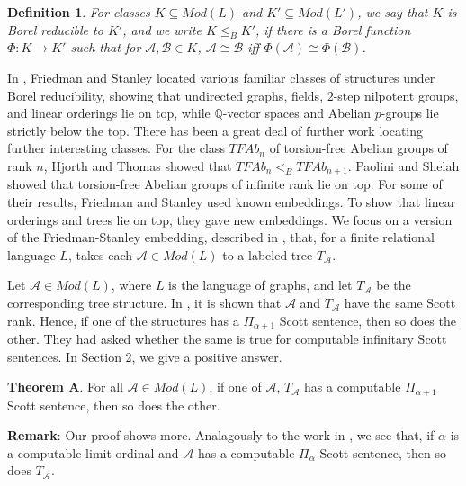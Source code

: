 \documentclass{article}
\newtheorem{defn}{Definition}
\begin{document}
\begin{defn} 

For classes $K\subseteq Mod(L)$ and $K'\subseteq Mod(L')$, we say that $K$ is \emph{Borel reducible} to $K'$, and we write $K\leq_B K'$, if there is a Borel function $\Phi:K\rightarrow K'$ such that for $\mathcal{A},\mathcal{B}\in K$, $\mathcal{A}\cong\mathcal{B}$ iff $\Phi(\mathcal{A})\cong\Phi(\mathcal{B})$.  

\end{defn}

In \cite{FS}, Friedman and Stanley located various familiar classes of structures under Borel reducibility, showing that undirected graphs, fields, $2$-step nilpotent groups, and linear orderings lie on top, while $\mathbb{Q}$-vector spaces and Abelian $p$-groups lie strictly below the top.   There has been a great deal of further work locating further interesting classes.  For the class $TFAb_n$ of torsion-free Abelian groups of rank $n$, Hjorth \cite{Hjorth} and Thomas \cite{Thomas} showed that $TFAb_n <_B TFAb_{n+1}$.  Paolini and Shelah \cite{PS} showed that torsion-free Abelian groups of infinite rank lie on top.  For some of their results, Friedman and Stanley used known embeddings.  To show that linear orderings and trees lie on top, they gave new embeddings.  We focus on a version of the Friedman-Stanley embedding, described in \cite{H-TM}, that, for a finite relational language $L$, takes each $\mathcal{A}\in Mod(L)$ to a labeled tree $T_\mathcal{A}$. 

\bigskip

Let $\mathcal{A}\in Mod(L)$, where $L$ is the language of graphs, and let $T_\mathcal{A}$ be the corresponding tree structure.  In \cite{GR}, it is shown that $\mathcal{A}$ and $T_\mathcal{A}$ have the same Scott rank.  Hence, if one of the structures has a $\Pi_{\alpha+1}$ Scott sentence, then so does the other.  They had asked whether the same is true for computable infinitary Scott sentences.   In Section 2, we give a positive answer.

\bigskip
\noindent
\textbf{Theorem A}. For all $\mathcal{A}\in Mod(L)$, if one of $\mathcal{A}$, $T_\mathcal{A}$ has a computable $\Pi_{\alpha+1}$ Scott sentence, then so does the other.  

\bigskip
\noindent
\textbf{Remark}:  Our proof shows more. Analagously to the work in \cite{GR}, we see that, if $\alpha$ is a computable limit ordinal and $\mathcal{A}$ has a computable $\Pi_\alpha$ Scott sentence, then so does $T_\mathcal{A}$.
\end{document}
